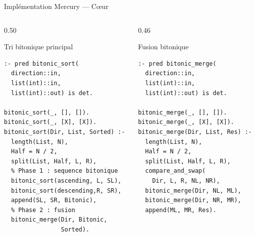 \documentclass[aspectratio=169,12pt]{beamer}
\begin{document}
\begin{frame}[fragile]{\faCode\quad Implémentation Mercury — Cœur}
  \begin{columns}[T]
    \begin{column}{0.50\textwidth}
      \begin{exampleblock}{Tri bitonique principal}
\begin{lstlisting}
:- pred bitonic_sort(
  direction::in,
  list(int)::in,
  list(int)::out) is det.

bitonic_sort(_, [], []).
bitonic_sort(_, [X], [X]).
bitonic_sort(Dir, List, Sorted) :-
  length(List, N),
  Half = N / 2,
  split(List, Half, L, R),
  % Phase 1 : sequence bitonique
  bitonic_sort(ascending, L, SL),
  bitonic_sort(descending,R, SR),
  append(SL, SR, Bitonic),
  % Phase 2 : fusion
  bitonic_merge(Dir, Bitonic,
                Sorted).
\end{lstlisting}
      \end{exampleblock}
    \end{column}
    \begin{column}{0.46\textwidth}
      \begin{exampleblock}{Fusion bitonique}
\begin{lstlisting}
:- pred bitonic_merge(
  direction::in,
  list(int)::in,
  list(int)::out) is det.

bitonic_merge(_, [], []).
bitonic_merge(_, [X], [X]).
bitonic_merge(Dir, List, Res) :-
  length(List, N),
  Half = N / 2,
  split(List, Half, L, R),
  compare_and_swap(
    Dir, L, R, NL, NR),
  bitonic_merge(Dir, NL, ML),
  bitonic_merge(Dir, NR, MR),
  append(ML, MR, Res).
\end{lstlisting}
      \end{exampleblock}
    \end{column}
  \end{columns}
\end{frame}
\end{document}
